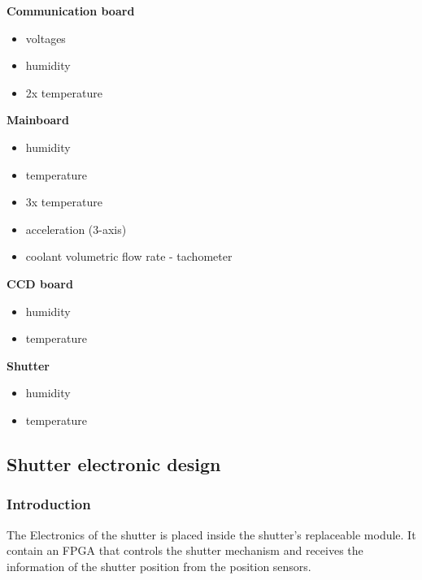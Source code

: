 \begin{description}

\item \textbf{Communication board} \hfill \\
\begin{itemize}
\item voltages
\item humidity
\item 2x temperature
\end{itemize}

\item \textbf{Mainboard} \hfill \\
\begin{itemize}
\item humidity
\item temperature
\item 3x temperature
\item acceleration (3-axis)
\item coolant volumetric flow rate - tachometer
\end{itemize}

\item \textbf{CCD board} \hfill \\
\begin{itemize}
\item humidity
\item temperature
\end{itemize}

\item \textbf{Shutter} \hfill \\
\begin{itemize}
\item humidity
\item temperature
\end{itemize}

\end{description}

\subsection{Shutter electronic design}

\subsubsection{Introduction}

The Electronics of the shutter is placed inside the shutter’s replaceable module. It contain an FPGA that controls the shutter mechanism and receives the information of the shutter position from the position sensors.

